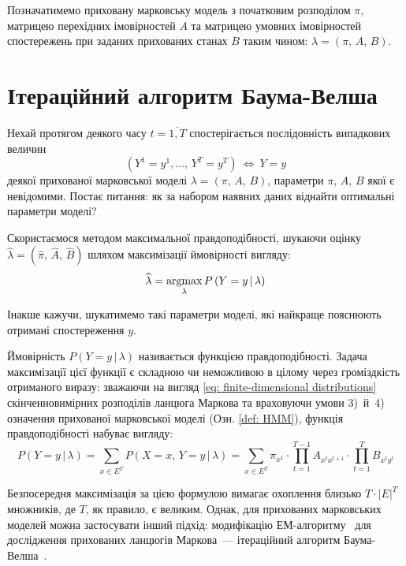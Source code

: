 Позначатимемо приховану марковську модель з початковим розподілом $\pi$, матрицею перехідних імовірностей $A$ та матрицею умовних імовірностей спостережень при заданих прихованих станах $B$ таким чином: $\lambda=(\pi,\,A,\,B)$.

\section{Ітераційний алгоритм Баума-Велша}

Нехай протягом деякого часу $t=\overline{1,T}$ спостерігається послідовність випадкових величин 
\begin{equation*}
    \left( Y^1=y^1,\ldots,\,Y^T=y^T \right)\ \Longleftrightarrow\ Y=y
\end{equation*}
деякої прихованої марковської моделі $\lambda=(\pi,\,A,\,B)$, параметри $\pi,\,A,\,B$ якої є невідомими. Постає питання: як за набором наявних даних віднайти оптимальні параметри моделі?

Скористаємося методом максимальної правдоподібності, шукаючи оцінку $\widehat{\lambda}=(\widehat{\pi},\,\widehat{A},\,\widehat{B})$ шляхом максимізації ймовірності вигляду:
\begin{equation*}
    \widehat{\lambda}=\operatorname*{argmax}\limits_{\lambda} P\left( Y=y \,|\, \lambda \right)
\end{equation*}

Інакше кажучи, шукатимемо такі параметри моделі, які найкраще пояснюють отримані спостереження $y$. 

Ймовірність $P\left( Y=y \,|\, \lambda \right)$ називається функцією правдоподібності. Задача максимізації цієї функції є складною чи неможливою в цілому через громіздкість отриманого виразу: зважаючи на вигляд \eqref{eq: finite-dimensional distributions} скінченновимірних розподілів ланцюга Маркова та враховуючи умови 3)~й~4) означення прихованої марковської моделі (Озн. \ref{def: HMM}), функція правдоподібності набуває вигляду:
\begin{equation}\label{eq: likelihood function}
    P\left( Y=y \,|\, \lambda \right) = \sum\limits_{x \in E^T} P\left( X=x,\, Y=y \,|\, \lambda \right) = \sum\limits_{x \in E^T} \pi_{x^1} \cdot \prod\limits_{t=1}^{T-1} A_{x^t x^{t+1}} \cdot \prod\limits_{t=1}^{T} B_{x^ty^t} 
\end{equation}

Безпосередня максимізація за цією формулою вимагає охоплення близько $T\cdot|E|^T$ множників, де $T$, як правило, є великим. Однак, для прихованих марковських моделей можна застосувати інший підхід: модифікацію ЕМ-алгоритму~\cite[розділ 4]{Koski2001} для дослідження прихованих ланцюгів Маркова~--- ітераційний алгоритм Баума-Велша~\cite[розділ 15]{Koski2001}. 

